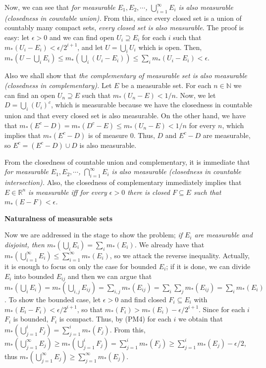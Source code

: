 \documentclass{article}
\newcommand{\NaN}{\mathbb{N}}
\newcommand{\ReR}{\mathbb{R}}
\begin{document}
Now, we can see that \textit{for measurable $E_1, E_2, \cdots$, $\bigcup_{i = 1}^\infty E_i$ is also measurable (closedness in countable union).}
From this, since every closed set is a union of countably many compact sets, \textit{every closed set is also measurable}.
The proof is easy: let $\epsilon > 0$ and we can find open $U_i \supseteq E_i$ for each $i$ such that $m_*(U_i - E_i) < \epsilon / 2^{i + 1}$, and let $U = \bigcup_i U_i$ which is open.
Then, $m_*(U - \bigcup_i E_i) \le m_*(\bigcup_i (U_i - E_i)) \le \sum_i m_*(U_i - E_i) < \epsilon$.

Also we shall show that \textit{the complementary of measurable set is also measurable (closedness in complementary).}
Let $E$ be a measurable set.
For each $n \in \NaN$ we can find an open $U_n \supseteq E$ such that $m_*(U_n - E) < 1/n$.
Now, we let $D = \bigcup_i (U_i)^c$, which is measurable because we have the closedness in countable union and that every closed set is also measurable.
On the other hand, we have that $m_*(E^c - D) = m_*(D^c - E) \le m_*(U_n - E) < 1/n$ for every $n$, which implies that $m_*(E^c - D)$ is of measure 0.
Thus, $D$ and $E^c - D$ are measurable, so $E^c = (E^c - D) \cup D$ is also measurable.

From the closedness of countable union and complementary, it is immediate that \textit{for measurable $E_1, E_2, \cdots$, $\bigcap_{i = 1}^\infty E_i$ is also measurable (closedness in countable intersection).}
Also, the closedness of complementary immediately implies that \textit{$E \in \ReR^n$ is measurable iff for every $\epsilon > 0$ there is closed $F \subseteq E$ such that $m_*(E - F) < \epsilon$.}

\newpage

\textbf{Naturalness of measurable sets}

Now we are addressed in the stage to show the problem; \textit{if $E_i$ are measurable and disjoint, then $m_*(\bigcup_i E_i) = \sum_i m_*(E_i)$.}
We already have that $m_*(\bigcup_{i = 1}^\infty E_i) \le \sum_{i = 1}^\infty m_*(E_i)$, so we attack the reverse inequality.
Actually, it is enough to focus on only the case for bounded $E_i$; if it is done, we can divide $E_i$ into bounded $E_{ij}$ and then we can argue that $m_*(\bigcup_i E_i) = m_*(\bigcup_{i, j} E_{ij}) = \sum_{i, j} m_*(E_{ij}) = \sum_i \sum_j m_*(E_{ij}) = \sum_i m_*(E_i)$.
To show the bounded case, let $\epsilon > 0$ and find closed $F_i \subseteq E_i$ with $m_*(E_i - F_i) < \epsilon / 2^{i + 1}$, so that $m_*(F_i) > m_*(E_i) - \epsilon / 2^{i + 1}$.
Since for each $i$ $F_i$ is bounded, $F_i$ is compact.
Thus, by (PM4) for each $i$ we obtain that $m_*(\bigcup_{j = 1}^i F_j) = \sum_{j = 1}^i m_*(F_j)$.
From this, $m_*(\bigcup_{j = 1}^\infty E_j) \ge m_*(\bigcup_{j = 1}^i F_j) = \sum_{j = 1}^i m_*(F_j) \ge \sum_{j = 1}^i m_*(E_j) - \epsilon / 2$, thus $m_*(\bigcup_{j = 1}^\infty E_j) \ge \sum_{j = 1}^\infty m_*(E_j)$.
\end{document}
